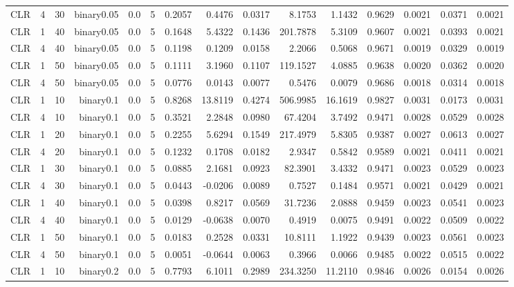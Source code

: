 \begin{longtable}{rrrrrrrrrrrrrrr}
  CLR & 4 & 30 & binary0.05 & 0.0 & 5 & 0.2057 & 0.4476 & 0.0317 & 8.1753 & 1.1432 & 0.9629 & 0.0021 & 0.0371 & 0.0021 \\ 
  CLR & 1 & 40 & binary0.05 & 0.0 & 5 & 0.1648 & 5.4322 & 0.1436 & 201.7878 & 5.3109 & 0.9607 & 0.0021 & 0.0393 & 0.0021 \\ 
  CLR & 4 & 40 & binary0.05 & 0.0 & 5 & 0.1198 & 0.1209 & 0.0158 & 2.2066 & 0.5068 & 0.9671 & 0.0019 & 0.0329 & 0.0019 \\ 
  CLR & 1 & 50 & binary0.05 & 0.0 & 5 & 0.1111 & 3.1960 & 0.1107 & 119.1527 & 4.0885 & 0.9638 & 0.0020 & 0.0362 & 0.0020 \\ 
  CLR & 4 & 50 & binary0.05 & 0.0 & 5 & 0.0776 & 0.0143 & 0.0077 & 0.5476 & 0.0079 & 0.9686 & 0.0018 & 0.0314 & 0.0018 \\ 
  CLR & 1 & 10 & binary0.1 & 0.0 & 5 & 0.8268 & 13.8119 & 0.4274 & 506.9985 & 16.1619 & 0.9827 & 0.0031 & 0.0173 & 0.0031 \\ 
  CLR & 4 & 10 & binary0.1 & 0.0 & 5 & 0.3521 & 2.2848 & 0.0980 & 67.4204 & 3.7492 & 0.9471 & 0.0028 & 0.0529 & 0.0028 \\ 
  CLR & 1 & 20 & binary0.1 & 0.0 & 5 & 0.2255 & 5.6294 & 0.1549 & 217.4979 & 5.8305 & 0.9387 & 0.0027 & 0.0613 & 0.0027 \\ 
  CLR & 4 & 20 & binary0.1 & 0.0 & 5 & 0.1232 & 0.1708 & 0.0182 & 2.9347 & 0.5842 & 0.9589 & 0.0021 & 0.0411 & 0.0021 \\ 
  CLR & 1 & 30 & binary0.1 & 0.0 & 5 & 0.0885 & 2.1681 & 0.0923 & 82.3901 & 3.4332 & 0.9471 & 0.0023 & 0.0529 & 0.0023 \\ 
  CLR & 4 & 30 & binary0.1 & 0.0 & 5 & 0.0443 & -0.0206 & 0.0089 & 0.7527 & 0.1484 & 0.9571 & 0.0021 & 0.0429 & 0.0021 \\ 
  CLR & 1 & 40 & binary0.1 & 0.0 & 5 & 0.0398 & 0.8217 & 0.0569 & 31.7236 & 2.0888 & 0.9459 & 0.0023 & 0.0541 & 0.0023 \\ 
  CLR & 4 & 40 & binary0.1 & 0.0 & 5 & 0.0129 & -0.0638 & 0.0070 & 0.4919 & 0.0075 & 0.9491 & 0.0022 & 0.0509 & 0.0022 \\ 
  CLR & 1 & 50 & binary0.1 & 0.0 & 5 & 0.0183 & 0.2528 & 0.0331 & 10.8111 & 1.1922 & 0.9439 & 0.0023 & 0.0561 & 0.0023 \\ 
  CLR & 4 & 50 & binary0.1 & 0.0 & 5 & 0.0051 & -0.0644 & 0.0063 & 0.3966 & 0.0066 & 0.9485 & 0.0022 & 0.0515 & 0.0022 \\ 
  CLR & 1 & 10 & binary0.2 & 0.0 & 5 & 0.7793 & 6.1011 & 0.2989 & 234.3250 & 11.2110 & 0.9846 & 0.0026 & 0.0154 & 0.0026 \\ 

\end{longtable}
